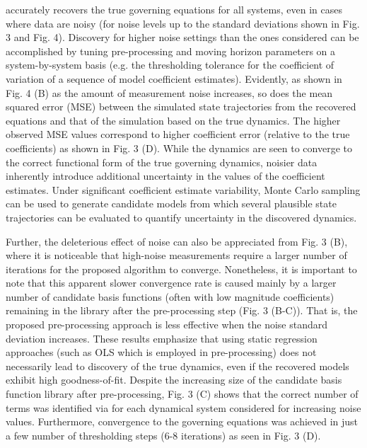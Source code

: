 \documentclass[12pt]{article}
\begin{document}
\ours{} accurately recovers the true governing equations for all systems, even in cases where data are noisy (for noise levels up to the standard deviations shown in Fig. 3 and Fig. 4). Discovery for higher noise settings than the ones considered can be accomplished by tuning pre-processing and moving horizon parameters on a system-by-system basis (e.g. the thresholding tolerance for the coefficient of variation of a sequence of model coefficient estimates).  Evidently, as shown in Fig. 4 (B) as the amount of measurement noise increases, so does the mean squared error (MSE) between the simulated state trajectories from the recovered equations and that of the simulation based on the true dynamics. The higher observed MSE values correspond to higher coefficient error (relative to the true coefficients) as shown in Fig. 3 (D). While the dynamics are seen to converge to the correct functional form of the true governing dynamics, noisier data inherently introduce additional uncertainty in the values of the coefficient estimates. Under significant coefficient estimate variability, Monte Carlo sampling can be used to generate candidate models from which several plausible state trajectories can be evaluated to quantify uncertainty in the discovered dynamics.


Further, the deleterious effect of noise can also be appreciated from Fig. 3 (B), where it is noticeable that high-noise measurements require a larger number of iterations for the proposed algorithm to converge. Nonetheless, it is important to note that this apparent slower convergence rate is caused mainly by a larger number of  candidate basis functions (often with low magnitude coefficients) remaining in the library after the pre-processing step (Fig. 3 (B-C)). That is, the proposed pre-processing approach is less effective  when the noise standard deviation increases. These results emphasize that using static regression approaches (such as OLS which is employed in pre-processing) does not necessarily lead to discovery of the true dynamics, even if the recovered models exhibit high goodness-of-fit. Despite the increasing size of the candidate basis function library after pre-processing, Fig. 3 (C) shows that the correct number of terms was identified via \ours{} for each dynamical system considered for increasing noise values. Furthermore, convergence to the governing equations was achieved in just a few number of thresholding steps (6-8 iterations) as seen in Fig. 3 (D).
\end{document}

